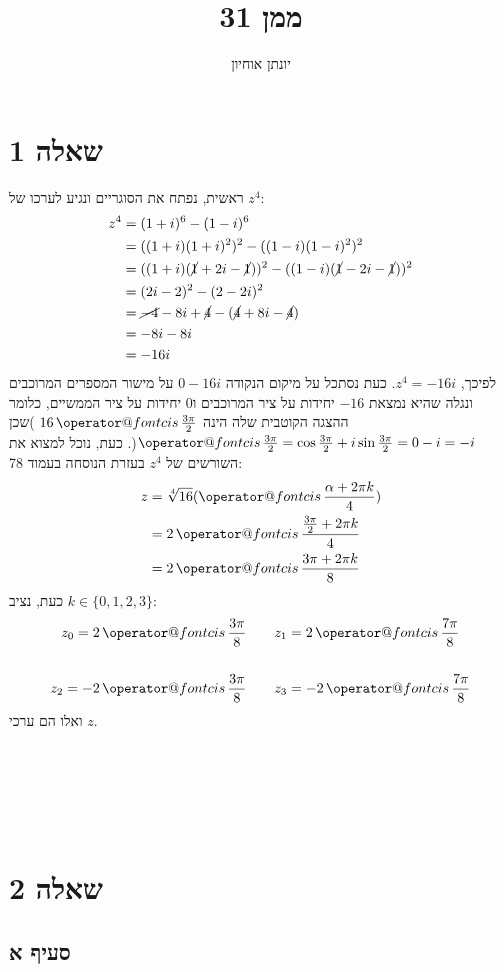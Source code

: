 \documentclass[11pt, oneside]{article}
\title{ממן 31}
\author{יונתן אוחיון}
\makeatletter
\newcommand{\qed}{\R{$\blacksquare$}}
\newcommand{\br}{\\\\\\\\\\\\}
\newcommand{\cis}[1]{\mathop{\operator@font cis}#1}
\makeatother
\begin{document}
\maketitle

\section{שאלה 1}
ראשית, נפתח את הסוגריים ונגיע לערכו של $z^4$:
\begin{align*}
z^4 & = (1 + i)^6 - (1 - i)^6\\
& = ((1 + i)(1 + i)^2)^2 - ((1 - i)(1 - i)^2)^2\\
& = ((1 + i)(\cancel{1} + 2i - \cancel{1}))^2 - ((1 - i)(\cancel{1} - 2i - \cancel{1}))^2\\
& = (2i - 2)^2 - (2 - 2i)^2\\
& = \cancel{-4} - 8i + \cancel{4} - (\cancel{4} + 8i - \cancel{4})\\
& = -8i - 8i\\
& = -16i
\end{align*}
\def\AT{\frac{3\pi}{2}}
לפיכך, $z^4 = -16i$. כעת נסתכל על מיקום הנקודה $0 - 16i$ על מישור המספרים המרוכבים ונגלה שהיא נמצאת $-16$ יחידות על ציר המרוכבים ו$0$ יחידות על ציר הממשיים, כלומר ההצגה הקוטבית שלה הינה $16\cis{\AT}$ )שכן $\cis{\AT} = \cos{\AT}+i\sin{\AT} = 0 - i = -i$(. כעת, נוכל למצוא את השורשים של $z^4$ בעזרת הנוסחה בעמוד 78:
\begin{align*}
z & = \sqrt[4]{16}(\cis{\frac{\alpha + 2 \pi k}{4}})\\
& = 2\cis{\frac{\AT + 2 \pi k}{4}}\\
& = 2\cis{\frac{3 \pi + 2 \pi k}{8}}
\end{align*}
כעת, נציב $k \in \{0, 1, 2, 3\}$:
\begin{align*}
z_0 = 2\cis{\frac{3\pi}{8}} \quad&\quad z_1 = 2\cis{\frac{7\pi}{8}}\\\\
z_2 = -2\cis{\frac{3\pi}{8}} \quad&\quad z_3 = -2\cis{\frac{7\pi}{8}}
\end{align*}
ואלו הם ערכי $z$.
\br\qed
\clearpage

\section{שאלה 2}
\subsection{סעיף א}
\end{document}
